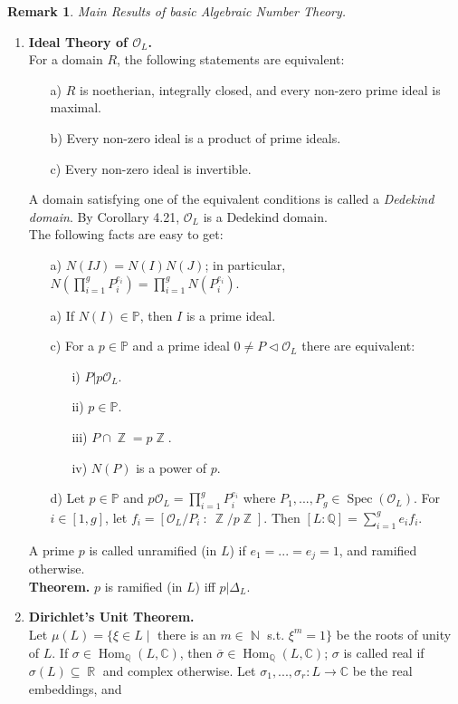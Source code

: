 \documentclass[12pt,a4paper]{report}
\theoremstyle{definition}
\newtheorem{Remark}[theorem]{Remark}
\theoremstyle{num.custom-title}
\DeclareMathOperator{\Hom}{Hom}
\DeclareMathOperator{\N}{\mathbb{N}}
\DeclareMathOperator{\R}{\mathbb{R}}
\DeclareMathOperator{\Z}{\mathbb{Z}}
\DeclareMathOperator{\sse}{\subseteq}
\DeclareMathOperator{\Spec}{Spec}
\newcommand{\ol}{\overline}
\newcommand{\C}{\mathbb{C}}
\newcommand{\Q}{\mathbb{Q}}
\renewcommand{\O}{\mathcal{O}}
\renewcommand{\P}{\mathbb{P}}
\begin{document}
\begin{Remark}
\emph{Main Results of basic Algebraic Number Theory.}
\begin{enumerate}
\item \textbf{Ideal Theory of $\O_L$.}\\
For a domain $R$, the following statements are equivalent:
\begin{itemize}
\item[a)] $R$ is noetherian, integrally closed, and every non-zero prime ideal is maximal.
\item[b)] Every non-zero ideal is a product of prime ideals.
\item[c)] Every non-zero ideal is invertible.
\end{itemize}
A domain satisfying one of the equivalent conditions is called a \emph{Dedekind domain}. By Corollary 4.21, $\O_L$ is a Dedekind domain.\\
The following facts are easy to get:
\begin{itemize}
\item[a)] $N(IJ)=N(I)N(J)$; in particular, $N(\prod_{i=1}^g P_i^{e_i})=\prod_{i=1}^g N(P_i^{e_i})$.
\item[a)] If $N(I) \in \P$, then $I$ is a prime ideal.
\item[c)] For a $p \in \P$ and a prime ideal $0 \neq P \lhd \O_L$ there are equivalent:
\begin{itemize}
\item[i)] $P | p \O_L$.
\item[ii)] $p \in \P$.
\item[iii)] $P \cap \Z = p\Z$.
\item[iv)] $N(P)$ is a power of $p$.
\end{itemize}
\item[d)] Let $p \in \P$ and $p \O_L = \prod_{i=1}^g P_i^{e_i}$ where $P_1,...,P_g \in \Spec(\O_L)$. For $i \in [1,g]$, let $f_i=[\O_L/P_i \ : \ \Z/p\Z]$. Then $[L:\Q] = \sum_{i=1}^g e_i f_i$.
\end{itemize}
A prime $p$ is called unramified (in $L$) if $e_1=...=e_j=1$, and ramified otherwise.\\
\textbf{Theorem.} $p$ is ramified (in $L$) iff $p | \Delta_L$.
\item \textbf{Dirichlet's Unit Theorem.}\\
Let $\mu(L)=\{ \xi \in L \mid $ there is an $m \in \N$ s.t. $\xi^m=1\}$ be the roots of unity of $L$. If $\sigma \in \Hom_\Q(L,\C)$, then $\ol{\sigma} \in \Hom_\Q(L,\C)$; $\sigma$ is called real if $\sigma(L) \sse \R$ and complex otherwise. Let $\sigma_1,...,\sigma_r : L \to \C$ be the real embeddings, and \[
\]
\end{enumerate}
\end{Remark}
\end{document}
